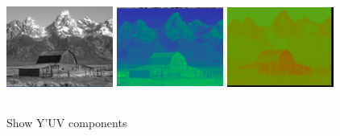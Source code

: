 \documentclass{article}
\begin{document}
\begin{multicols*}{2}
\begin{figure}[H]
\includegraphics[height=35mm,width=35mm]{Yla.png}
\includegraphics[height=35mm,width=35mm]{U.png}
\includegraphics[height=35mm,width=35mm]{V.png}
\caption{Show Y'UV components}
\end{figure}

\end{multicols*}
\end{document}
